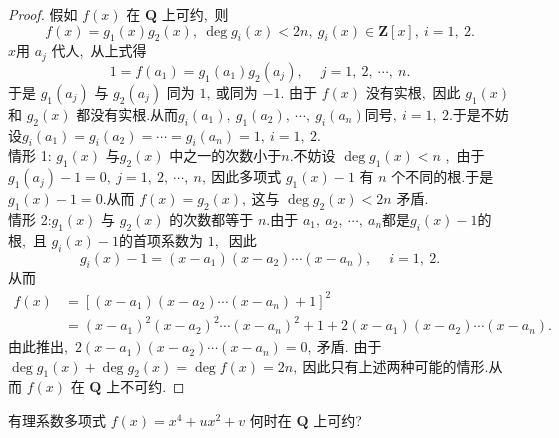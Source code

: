 \begin{proof}
	假如 $ f(x) $ 在 $ \mathbf{Q}$  上可约,\  则
	$$f(x)=g_{1}(x) g_{2}(x),\  \operatorname{deg} g_{i}(x)<2 n,\  g_{i}(x) \in \mathbf{Z}[x],\  i=1,\ 2 .$$
	$x  $用 $ a_{j} $ 代人,\  从上式得
	$$1=f\left(a_{1}\right)=g_{1}\left(a_{1}\right) g_{2}\left(a_{j}\right),\  \quad j=1,\ 2,\  \cdots,\  n .$$
	于是 $ g_{1}\left(a_{j}\right)$  与 $ g_{2}\left(a_{j}\right) $ 同为 $1 ,\  $或同为 $ -1  .$
	由于 $ f(x) $ 没有实根,\  因此 $ g_{1}(x)$  和  $g_{2}(x) $ 都没有实根.从而$  g_{i}\left(a_{1}\right),\  g_{1}\left(a_{2}\right),\  \cdots ,\   g_{i}\left(a_{n}\right)  $同号$,\   i=1,\ 2  .$于是不妨设$  g_{i}\left(a_{1}\right)=g_{i}\left(a_{2}\right)=\cdots=g_{i}\left(a_{n}\right)=1,\  i=1,\ 2  .$\\
	情形  1: $g_{1}(x) $ 与$  g_{2}(x)$  中之一的次数小于$n.$不妨设  $\operatorname{deg} g_{1}(x)<n$ ,\ 由于$g_{1}(a_j)-1 =0,\  j=1,\ 2,\  \cdots,\  n ,\  $因此多项式 $ g_{1}(x)-1 $ 有 $ n $ 个不同的根.于是 $ g_{1}(x)-1=0  .$从而 $ f(x)=g_{2}(x) ,\  $这与 $ \operatorname{deg} g_{2}(x)<2 n $ 矛盾.\\
	情形  2:$ g_{1}(x) $ 与  $g_{2}(x) $ 的次数都等于  $n  .$由于 $ a_{1},\  a_{2},\  \cdots,\  a_{n}  $都是$  g_{i}(x)-1  $的根,\  且 $ g_{i}(x)-1  $的首项系数为 $1 ,\ $ 因此
	$$g_{i}(x)-1=\left(x-a_{1}\right)\left(x-a_{2}\right) \cdots\left(x-a_{n}\right),\  \quad i=1,\ 2 . $$
	从而
	\begin{align*}
		f(x)&=\left[\left(x-a_{1}\right)\left(x-a_{2}\right) \cdots\left(x-a_{n}\right)+1\right]^{2} \\
		&=\left(x-a_{1}\right)^{2}\left(x-a_{2}\right)^{2} \cdots\left(x-a_{n}\right)^{2}+1+2\left(x-a_{1}\right)\left(x-a_{2}\right) \cdots\left(x-a_{n}\right) .
	\end{align*}
	由此推出,\ $2  \left(x-a_{1}\right)\left(x-a_{2}\right) \cdots\left(x-a_{n}\right)=0 ,\  $矛盾.
	由于 $ \operatorname{deg} g_{1}(x)+\operatorname{deg} g_{2}(x)=\operatorname{deg} f(x)=2 n ,\  $因此只有上述两种可能的情形.从而 $ f(x) $ 在 $ \mathbf{Q} $ 上不可约.
\end{proof}
\newpage
\begin{problem}
	有理系数多项式 $ f(x)=x^{4}+u x^{2}+v $ 何时在 $ \mathbf{Q} $ 上可约?
\end{problem}
